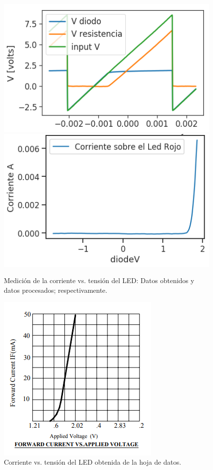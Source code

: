 \begin{figure}[H]
\centering
\includegraphics[scale=0.5]{../EJ1/LED/datosOsciloscopioLED}
\includegraphics[scale=0.5]{../EJ1/LED/LEDMedido}
\caption{Medici\'on de la corriente vs. tensi\'on del LED: Datos obtenidos y datos procesados; respectivamente.}
\label{med3b}
\end{figure}

\begin{figure}[!ht]
\centering
\includegraphics[scale=0.8]{../EJ1/LED/LedDataSheet}
\caption{Corriente vs. tensi\'on del LED obtenida de la hoja de datos.}
\label{med3c}
\end{figure}
